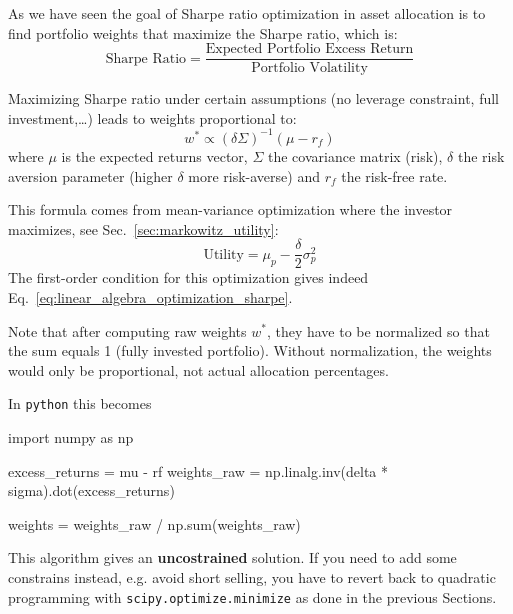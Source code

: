 \begin{finmarkets}
As we have seen the goal of Sharpe ratio optimization in asset allocation is to find portfolio weights that maximize the Sharpe ratio, which is:
\begin{equation*}
\text{Sharpe Ratio} = \frac{\text{Expected Portfolio Excess Return}}{\text{Portfolio Volatility}}
\end{equation*}

Maximizing Sharpe ratio under certain assumptions (no leverage constraint, full investment,\ldots) leads to weights proportional to:
\begin{equation}
w^*\propto (\delta\Sigma)^{-1}(\mu-r_f)
\label{eq:linear_algebra_optimization_sharpe}
\end{equation}
where $\mu$ is the expected returns vector, $\Sigma$ the covariance matrix (risk), $\delta$ the risk aversion parameter (higher $\delta$ more risk-averse) and $r_f$ the risk-free rate.

This formula comes from mean-variance optimization where the investor maximizes, see Sec.~\ref{sec:markowitz_utility}:
\begin{equation*}
\text{Utility} = \mu_p - \frac{\delta}{2} \sigma_p^2
\end{equation*}
The first-order condition for this optimization gives indeed Eq.~\ref{eq:linear_algebra_optimization_sharpe}.

Note that after computing raw weights $w^*$, they have to be normalized so that the sum equals 1 (fully invested portfolio).
Without normalization, the weights would only be proportional, not actual allocation percentages.

In \texttt{python} this becomes
\begin{ipythonbox}
import numpy as np

excess_returns = mu - rf
weights_raw = np.linalg.inv(delta * sigma).dot(excess_returns)

weights = weights_raw / np.sum(weights_raw)
\end{ipythonbox}

This algorithm gives an \textbf{uncostrained} solution. If you need to add some constrains instead, e.g. avoid short selling, you have to revert back to quadratic programming with \texttt{scipy.optimize.minimize} as done in the previous Sections.
\end{finmarkets}

